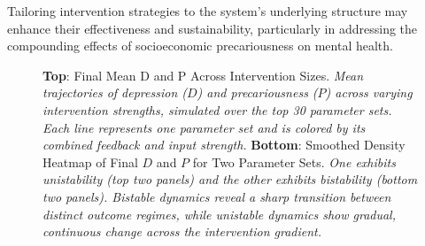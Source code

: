 \documentclass[
]{article}
\begin{document}
Tailoring intervention strategies to the system's underlying structure
may enhance their effectiveness and sustainability, particularly in
addressing the compounding effects of socioeconomic precariousness on
mental health.

\begin{figure}


\caption{\label{fig-intervention}\textbf{Top}: Final Mean D and P Across
Intervention Sizes. \emph{Mean trajectories of depression (\(D\)) and
precariousness (\(P\)) across varying intervention strengths, simulated
over the top 30 parameter sets. Each line represents one parameter set
and is colored by its combined feedback and input strength.}
\textbf{Bottom}: Smoothed Density Heatmap of Final \(D\) and \(P\) for
Two Parameter Sets. \emph{One exhibits unistability (top two panels) and
the other exhibits bistability (bottom two panels). Bistable dynamics
reveal a sharp transition between distinct outcome regimes, while
unistable dynamics show gradual, continuous change across the
intervention gradient.}}

\end{figure}%
\end{document}
